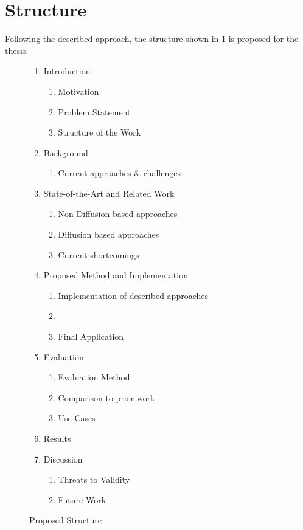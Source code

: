 \documentclass[10pt,a4paper]{scrartcl} %
\begin{document}
\section{Structure}
\label{sec:structure}
Following the described approach, the structure shown in \cref{fig:Structure} is proposed for the thesis.

\begin{figure}[h]
		\caption{Proposed Structure}
	\begin{enumerate}[label*=\arabic*.]
		\item Introduction
		\begin{enumerate}[label*=\arabic*]
			\item Motivation
			\item Problem Statement
			\item Structure of the Work
		\end{enumerate}
		\item Background
		\begin{enumerate}[label*=\arabic*]
      \item Current approaches \& challenges
		\end{enumerate}
		\item State-of-the-Art and Related Work
		\begin{enumerate}[label*=\arabic*]
      \item Non-Diffusion based approaches
			\item Diffusion based approaches
			\item Current shortcomings
		\end{enumerate}
		\item Proposed Method and Implementation
		\begin{enumerate}[label*=\arabic*]
      \item Implementation of described approaches
      \item 
      \item Final Application
		\end{enumerate}	
		\item Evaluation
		\begin{enumerate}[label*=\arabic*]
			\item Evaluation Method
			\item Comparison to prior work
			\item Use Cases
		\end{enumerate}
		\item Results
		\item Discussion
		\begin{enumerate}[label*=\arabic*]
			\item Threats to Validity
			\item Future Work
		\end{enumerate}
	\end{enumerate}
	\label{fig:Structure}
\end{figure}
\pagebreak


\end{document}
